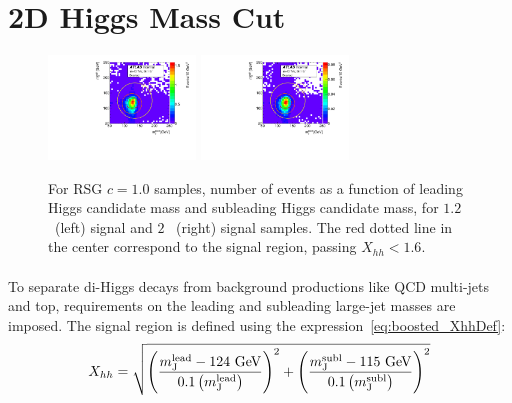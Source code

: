 
\section{2D Higgs Mass Cut}

\begin{figure}[htbp!]
\begin{center}
\includegraphics[width=0.35\textwidth,angle=-90]{figures/boosted/Truth/Sig_1200_AllTag_Incl_mH0H1.pdf}
\includegraphics[width=0.35\textwidth,angle=-90]{figures/boosted/Truth/Sig_2000_AllTag_Incl_mH0H1.pdf}
\caption{For RSG $c=1.0$ samples, number of events as a function of leading Higgs candidate mass and subleading Higgs candidate mass, for $1.2$ \TeV~(left) signal and $2$ \TeV~(right) signal samples. The red dotted line in the center correspond to the signal region, passing $X_{hh} < 1.6$.}
\label{fig:evt-signal-mhh}
\end{center}
\end{figure}

\paragraph{}
To separate di-Higgs decays from background productions like QCD multi-jets and top, requirements on the leading and subleading large-\R jet masses are imposed.
The signal region is defined using the expression~\ref{eq:boosted_XhhDef}:
\begin{equation}
\label{eq:boosted_XhhDef}
X_{hh} = \sqrt{\left(\frac{m^{\rm lead}_{\rm J} - \text{124 GeV}}{0.1 \left(m^{\rm lead}_{\rm J}\right)}\right)^2 + \left(\frac{m^{\rm subl}_{\rm J}- \text{115 GeV}}{0.1 \left(m^{\rm subl}_{\rm J}\right)}\right)^2}
\end{equation}

